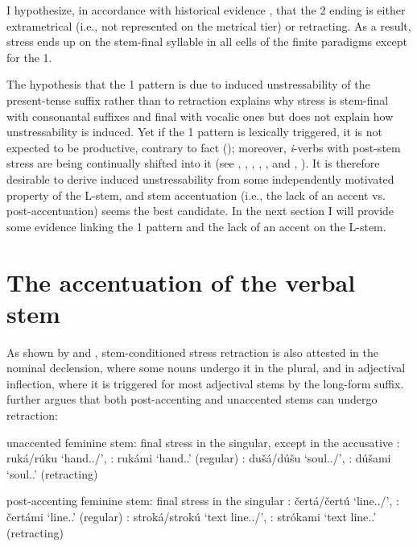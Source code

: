 \documentclass[output=paper,colorlinks,citecolor=black,koreanfont]{langscibook}
\begin{document}
\noindent I hypothesize, in accordance with historical evidence \citep[316--322]{Zaliznjak1985}, that the {2\PL} ending is either extrametrical (i.e., not represented on the metrical tier) or retracting. As a result, stress ends up on the stem-final syllable in all cells of the finite paradigms except for the {1\SG}.

The hypothesis that the {1\SG} pattern is due to induced unstressability of the present-tense suffix rather than to retraction explains why stress is stem-final with consonantal suffixes and final with vocalic ones but does not explain how unstressability is induced. Yet if the {1\SG} pattern is lexically triggered, it is not expected to be productive, contrary to fact (); moreover, \textit{i}-verbs with post-stem stress are being continually shifted into it (see \citealt[29]{Zaliznjak1985}, \citeyear{Zaliznjak2019}, \citealt[57--59]{Feldstein1986}, \citealt[108]{Choi1996}, \citealt[132]{MarklundSharapova2000}, and \citealt[469]{Eskova2008}, \citeyear[469]{Eskova2014}). It is therefore desirable to derive induced unstressability from some independently motivated property of the L-stem, and stem accentuation (i.e., the lack of an accent vs. post-accentuation) seems the best candidate. In the next section I will provide some evidence linking the {1\SG} pattern and the lack of an accent on the L-stem.

\section{The accentuation of the verbal stem}\label{mat:sec:Accentuation}

As shown by \citet{Halle1973,Halle1975,Halle1997} and \citet{Melvold1989}, stem-conditioned stress retraction is also attested in the nominal declension, where some nouns undergo it in the plural, and in adjectival inflection, where it is triggered for most adjectival stems by the long-form suffix. \citet{Melvold1989} further argues that both post-accenting and unaccented stems can undergo retraction:

\ea unaccented feminine stem: final stress in the singular, except in the accusative
\ea {\SG}: ruká/rúku ‘hand.{\SG.\NOM/\ACC}’, {\PL}: rukámi ‘hand.{\PL.\INS}’ \hfill (regular)
\ex {\SG}: dušá/dúšu ‘soul.{\SG.\NOM/\ACC}’, {\PL}: dúšami ‘soul.{\PL.\INS}’ \hfill (retracting)
\z
\z

\ea post-accenting feminine stem: final stress in the singular
\ea {\SG}: čertá/čertú ‘line.{\SG.\NOM/\ACC}’, {\PL}: čertámi ‘line.{\PL.\INS}’ \hfill (regular)
\ex {\SG}: stroká/strokú ‘text line.{\SG.\NOM/\ACC}’, {\PL}: strókami ‘text line.{\PL.\INS}’ \hspace*{\fill} (retracting)
\z
\z
\end{document}
